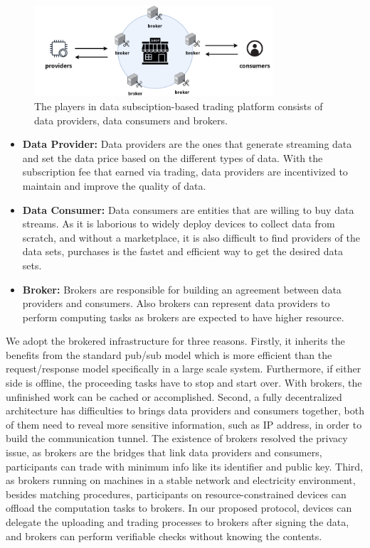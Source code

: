 \documentclass[conference]{IEEEtran}
\begin{document}
\begin{figure}[!t]
    \centering
    \includegraphics[width=3.5in]{pub_sub_model}
    \caption{The players in data subsciption-based trading platform consists of data providers, data consumers and brokers.}
    \label{fig:pub_sub_model}
\end{figure}

\begin{itemize}
\item \textbf{Data Provider: }
Data providers are the ones that generate streaming data and set the data price based on the different types of data. With the subscription fee that earned via trading, data providers are incentivized to maintain and improve the quality of data.
\item \textbf{Data Consumer: }
Data consumers are entities that are willing to buy data streams. As it is laborious to widely deploy devices to collect data from scratch, and without a marketplace, it is also difficult to find providers of the data sets, purchases is the fastet and efficient way to get the desired data sets. 
\item \textbf{Broker: }
Brokers are responsible for building an agreement between data providers and consumers. Also brokers can represent data providers to perform computing tasks as brokers are expected to have higher resource. 
\end{itemize}

We adopt the brokered infrastructure for three reasons. Firstly, it inherits the benefits from the standard pub/sub model which is more efficient than the request/response model specifically in a large scale system. Furthermore, if either side is offline, the proceeding tasks have to stop and start over. With brokers, the unfinished work can be cached or accomplished. Second, a fully decentralized architecture has difficulties to brings data providers and consumers together, both of them need to reveal more sensitive information, such as IP address, in order to build the communication tunnel. The existence of brokers resolved the privacy issue, as brokers are the bridges that link data providers and consumers, participants can trade with minimum info like its identifier and public key. Third, as brokers running on machines in a stable network and electricity environment, besides matching procedures, participants on resource-constrained devices can offload the computation tasks to brokers. In our proposed protocol, devices can delegate the uploading and trading processes to brokers after signing the data, and brokers can perform verifiable checks without knowing the contents.           
\end{document}
